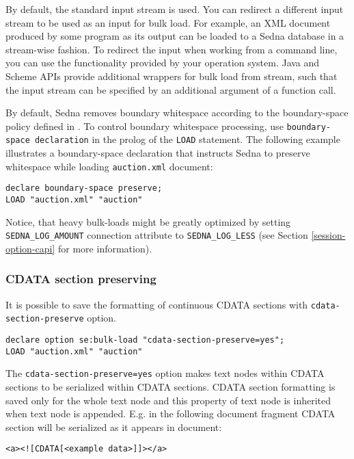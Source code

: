 \documentclass[a4paper,12pt]{article}
\begin{document}
By default, the standard input stream is used. You can redirect a different
input stream to be used as an input for bulk load. For example, an XML document
produced by some program as its output can be loaded to a Sedna database in a
stream-wise fashion. To redirect the input when working from a command line, you
can use the functionality provided by your operation system. Java and Scheme
APIs provide additional wrappers for bulk load from stream, such that the input
stream can be specified by an additional argument of a function call.

By default, Sedna removes boundary whitespace according to the boundary-space
policy defined in \cite{paper:query-language}. To control boundary whitespace
processing, use \verb!boundary-space declaration! \cite{paper:query-language} in
the prolog of the \verb!LOAD! statement. The following example illustrates a
boundary-space declaration that instructs Sedna to preserve whitespace while
loading \verb!auction.xml! document:

\begin{verbatim}
declare boundary-space preserve;
LOAD "auction.xml" "auction"
\end{verbatim}

Notice, that heavy bulk-loads might be greatly optimized by setting
\verb!SEDNA_LOG_AMOUNT! connection attribute to \verb!SEDNA_LOG_LESS! (see
Section \ref{session-option-capi} for more information).

\subsubsection{CDATA section preserving}

It is possible to save the formatting of continuous CDATA sections with
\verb!cdata-section-preserve! option.

\begin{verbatim}
declare option se:bulk-load "cdata-section-preserve=yes";
LOAD "auction.xml" "auction"
\end{verbatim}

The \verb/cdata-section-preserve=yes/ option makes text nodes within CDATA
sections to be serialized within CDATA sections. CDATA section formatting is
saved only for the whole text node and this property of text node is inherited
when text node is appended. E.g. in the following document fragment CDATA
section will be serialized as it appears in document:

\begin{verbatim}
<a><![CDATA[<example data>]]></a>
\end{verbatim}
\end{document}
